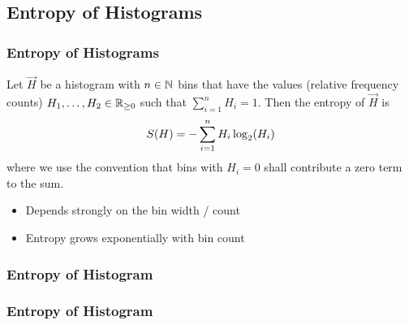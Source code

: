 \documentclass{beamer}
\begin{document}
\subsection{Entropy of Histograms}
\begin{frame}
  \frametitle{Entropy of Histograms}
  \begin{definition}
    Let \(\Vec{H}\) be a histogram with \(n\in\mathbb{N}\) bins that have the values (relative frequency counts)
    \(H_1,\ldots,H_2\in\RealsNN\) such that \(\sum_{i=1}^{n}H_i=1\).  Then the entropy of \(\Vec{H}\) is
    \begin{equation*}
      \Entropy(\Vec{H}) = -\sum_{i=1}^{n} H_i \log_2(H_i)
    \end{equation*}
    where we use the convention that bins with \(H_i=0\) shall contribute a zero term to the sum.
  \end{definition}
  \par\bigskip
  \begin{itemize}
  \item Depends strongly on the bin width / count
  \item Entropy grows exponentially with bin count
  \end{itemize}
\end{frame}

\begin{frame}
  \frametitle{Entropy of Histogram}
  \begin{center}
  \end{center}
\end{frame}

\begin{frame}
  \frametitle{Entropy of Histogram}
  \begin{center}
  \end{center}
\end{frame}
\end{document}
